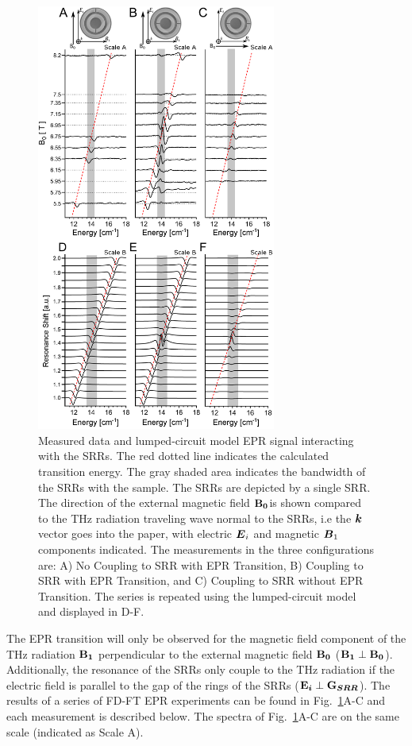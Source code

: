 \begin{figure}[htbp]\centering
  \includegraphics[width=0.7\textwidth]{Kapitel/Ch3-Images/HugeData.eps}%
  \caption[FD-FT EPR Data and Lumped-Circuit Model with SRRs]{Measured data and lumped-circuit model EPR signal interacting with the SRRs. The red dotted line indicates the calculated transition energy. The gray shaded area indicates the bandwidth of the SRRs with the sample. The SRRs are depicted by a single SRR. The direction of the external magnetic field $\textbf{B}\boldsymbol{_{0}}$is shown compared to the THz radiation traveling wave normal to the SRRs, i.e the $\boldsymbol{k}$ vector goes into the paper, with electric $\boldsymbol{E}_i$ and magnetic $\boldsymbol{B}_1$ components indicated. The measurements in the three configurations are: A) No Coupling to SRR with EPR Transition, B) Coupling to SRR with EPR Transition, and C) Coupling to SRR without EPR Transition. The series is repeated using the lumped-circuit model and displayed in D-F.\label{ch3-fig:datacompare}}
\end{figure}

The EPR transition will only be observed for the magnetic field component of the THz radiation $\textbf{B}\boldsymbol{_{1}}$ perpendicular to the external magnetic field $\textbf{B}\boldsymbol{_{0}}$ ($\textbf{B}\boldsymbol{_{1}} \perp \textbf{B}\boldsymbol{_{0}}$). \cite{Nehrkorn15_PRL} Additionally, the resonance of the SRRs only couple to the THz radiation if the electric field is parallel to the gap of the rings of the SRRs ($\textbf{E}\boldsymbol{_{i}}\perp\textbf{G}\boldsymbol{_{SRR}}$). \cite{Katsarakis04} The results of a series of FD-FT EPR experiments can be found in Fig.~\ref{ch3-fig:datacompare}A-C and each measurement is described below. The spectra of Fig.~\ref{ch3-fig:datacompare}A-C are on the same scale (indicated as Scale A).

